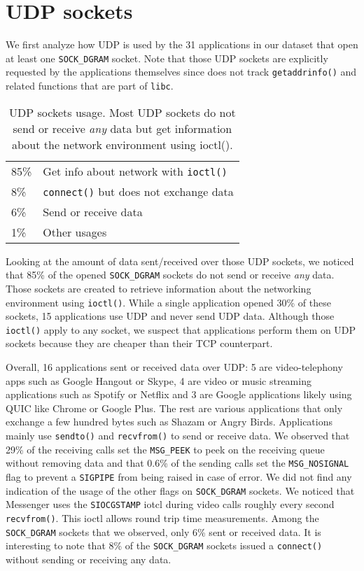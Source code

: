 \section{UDP sockets}\label{sec:udp}

We first analyze how UDP is used by the 31 applications in our dataset that
open at least one \texttt{SOCK\_DGRAM} socket. Note that those UDP sockets are
explicitly requested by the applications themselves since \tcpsnitch does not
track \texttt{getaddrinfo()} and related functions that are part of
\texttt{libc}.

\begin{table}[]
\centering
\begin{tabular}{ll}
85\% & Get info about network with \texttt{ioctl()} \\
8\% & \texttt{connect()} but does not exchange data \\
6\% & Send or receive data \\
1\% & Other usages
\end{tabular}
\caption{UDP sockets usage. \textmd{Most UDP sockets do not send or receive 
\emph{any} data but get information about the network environment using ioctl().}}
\label{tab:udp_sockets_usage}
\end{table}

Looking at the amount of data sent/received over those UDP sockets, we
noticed that 85\% of the opened \texttt{SOCK\_DGRAM}
sockets do not send or receive \emph{any} data. Those sockets are
created to retrieve information about the networking environment using
\texttt{ioctl()}. While a single application opened 30\% of these
sockets, 15 applications use UDP and never send UDP data. Although those
\texttt{ioctl()} apply to any socket, we
suspect that applications perform them on UDP sockets because they are
cheaper than their TCP counterpart.

Overall, 16 applications sent or received data over UDP: 5 are
video-telephony apps such as Google Hangout or Skype, 4 are video
or music streaming applications such as Spotify or Netflix and 3 are
Google applications likely using QUIC like Chrome or Google Plus. The rest
are various applications that only exchange a few hundred bytes such as
Shazam or Angry Birds. Applications mainly use \texttt{sendto()} and
\texttt{recvfrom()} to send or receive data. We observed that 29\% of the
receiving calls set the \texttt{MSG\_PEEK} to peek on the receiving queue without
removing data and that 0.6\% of the sending calls set the \texttt{MSG\_NOSIGNAL}
flag to prevent a \texttt{SIGPIPE} from being raised in case of error.
We did not find any indication of the usage of the other flags on
\texttt{SOCK\_DGRAM} sockets. We noticed that Messenger uses the
\texttt{SIOCGSTAMP} iotcl during video calls roughly every second
\texttt{recvfrom()}. This ioctl allows round trip time measurements. Among the
\texttt{SOCK\_DGRAM} sockets that we observed, only 6\% sent or received data.
It is interesting to note that 8\% of the \texttt{SOCK\_DGRAM} sockets issued
a \texttt{connect()} without sending or receiving any data.

